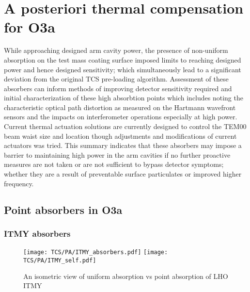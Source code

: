 \section{A posteriori thermal compensation for O3a}
While approaching designed arm cavity power, the presence of non-uniform absorption on the test mass coating surface imposed limits to reaching designed power and hence designed sensitivity; which simultaneously lead to a significant deviation from the original TCS pre-loading algorithm.  Assessment of these absorbers can inform methods of improving detector sensitivity required and initial characterization of these high absorbtion points which includes noting the characteristic optical path distortion as measured on the Hartmann wavefront sensors and the impacts on interferometer operations especially at high power. Current thermal actuation solutions are currently designed to control the TEM00 beam waist size and location though adjustments and modifications of current actuators was tried. This summary indicates that these absorbers may impose a barrier to maintaining high power in the arm cavities if no further proactive measures are not taken or are not sufficient to bypass detector symptoms; whether they are a result of preventable surface particulates or improved higher frequency.  


\subsection{Point absorbers in O3a}
\subsubsection{ITMY absorbers}
\begin{figure}[H]
  \centering
  \begin{subcaptiongroup}
	  \texttt{[image: TCS/PA/ITMY\_absorbers.pdf]}
	  \label{subfig:itmypajustself}
	  \texttt{[image: TCS/PA/ITMY\_self.pdf]}
	  \label{subfig:itmypaselfplusabs}
  \end{subcaptiongroup}
  \captionsetup{subrefformat=parens}
  \hfill
  \caption{An isometric view of uniform absorption vs point absorption of LHO ITMY}
  \label{fig:ITMYpabs}
\end{figure}

